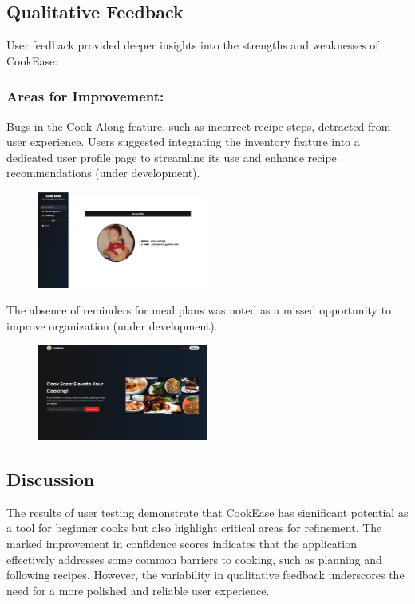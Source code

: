 \documentclass[10pt,twocolumn]{article}
\begin{document}
\subsection{Qualitative Feedback}
User feedback provided deeper insights into the strengths and weaknesses of CookEase:
\subsubsection{Areas for Improvement:}
Bugs in the Cook-Along feature, such as incorrect recipe steps, detracted from user experience.
Users suggested integrating the inventory feature into a dedicated user profile page to streamline its use and enhance recipe recommendations (under development).
\begin{figure}[h!]
\includegraphics[width=0.5\textwidth]{images/UserProfile.png}
\centering
\end{figure} 
The absence of reminders for meal plans was noted as a missed opportunity to improve organization (under development).
\begin{figure}[h!]
\includegraphics[width=0.5\textwidth]{images/JoinUS.png}
\centering
\end{figure} 

\subsection{Discussion}
The results of user testing demonstrate that CookEase has significant potential as a tool for beginner cooks but also highlight critical areas for refinement. The marked improvement in confidence scores indicates that the application effectively addresses some common barriers to cooking, such as planning and following recipes. However, the variability in qualitative feedback underscores the need for a more polished and reliable user experience.
\end{document}

